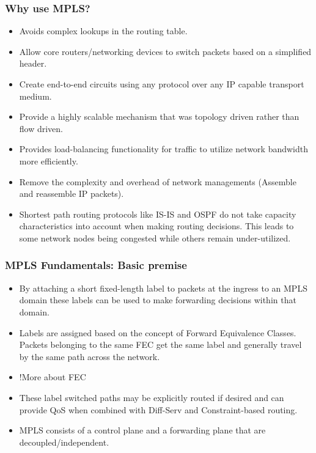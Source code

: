 \documentclass[12pt]{beamer}
\begin{document}
\begin{frame}
  \frametitle{Why use MPLS?}
  \begin{itemize}
    \item Avoids complex lookups in the routing table.
    \item Allow core routers/networking devices to switch packets based on a simplified header.
    \item Create end-to-end circuits using any protocol over any IP capable transport medium.
    \item Provide a highly scalable mechanism that was topology driven rather than flow driven.
    \item Provides load-balancing functionality for traffic to utilize network bandwidth more efficiently.
    \item Remove the complexity and overhead of network managements (Assemble and reassemble IP packets).       
    \item Shortest path routing protocols like IS-IS and OSPF do not take capacity characteristics into account when making routing decisions. This leads to some network nodes being congested while others remain under-utilized.
  \end{itemize}
\end{frame}

\begin{frame}
  \frametitle{MPLS Fundamentals: Basic premise}
  \begin{itemize}
    \item By attaching a short fixed-length label to packets at the ingress to an MPLS domain these labels can be used to make forwarding decisions within that domain.
    \item Labels are assigned based on the concept of Forward Equivalence Classes. Packets belonging to the same FEC get the same label and generally travel by the same path across the network.
    \item !More about FEC
    \item These label switched paths may be explicitly routed if desired and can provide QoS when combined with Diff-Serv and Constraint-based routing.
    \item MPLS consists of a control plane and a forwarding plane that are decoupled/independent.    
    \end{itemize}
\end{frame}
\end{document}
